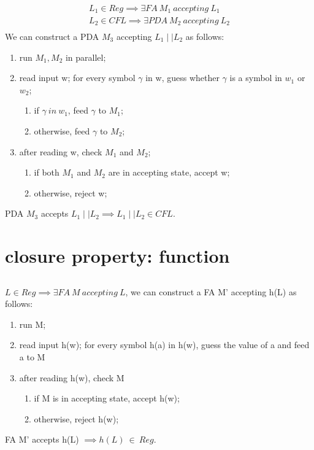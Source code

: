 \documentclass{article}
\begin{document}
\begin{align*}
L_1 \in Reg \implies \exists FA \ M_1 \ accepting \ L_1\\
L_2 \in CFL \implies \exists PDA \ M_2 \ accepting \ L_2\\
\end{align*}
We can construct a PDA $ M_3 $ accepting $ L_1 \mid \mid  L_2 $ as follows:
\begin{enumerate}
	\item run $ M_1, M_2 $ in parallel;
	\item read input w; for every symbol $\gamma $ in w, guess whether $\gamma$ is a symbol in $ w_1 $ or $ w_2 $;
	\begin{enumerate}
		\item if $ \gamma \ in \ w_1 $, feed $ \gamma $ to $ M_1 $;
		\item otherwise, feed $ \gamma $ to $ M_2 $;
	\end{enumerate}
	\item after reading w, check $ M_1 $ and $ M_2 $;
	\begin{enumerate}
		\item if both $ M_1  $ and $ M_2 $ are in accepting state, accept w;
		\item otherwise, reject w;	
	\end{enumerate}
\end{enumerate}
PDA $ M_3 $ accepts $L_1 \mid \mid  L_2 \implies L_1 \mid \mid  L_2 \in CFL$.

\section{closure property: function}

\subsection{}

$ L \in Reg \implies \exists FA \ M \ accepting \ L $, we can construct a FA M' accepting h(L) as follows:
\begin{enumerate}
	\item run M;
	\item read input h(w); for every symbol h(a) in h(w), guess the value of a and feed a to M
	\item after reading h(w), check M
	\begin{enumerate}
		\item if M is in accepting state, accept h(w);
		\item otherwise, reject h(w);
	\end{enumerate}
\end{enumerate}
FA M' accepts h(L) $ \implies h(L) \ \in \ Reg $.
\end{document}
